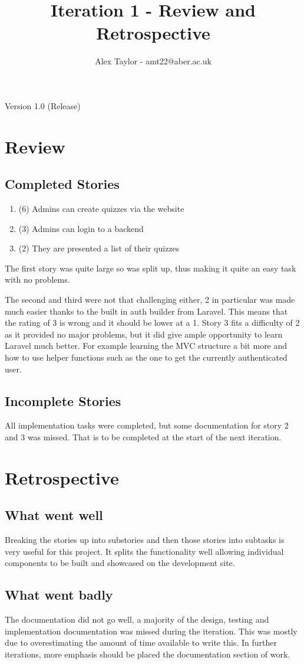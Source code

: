 \documentclass{article}
\title{Iteration 1 - Review and Retrospective}
\author{Alex Taylor - amt22@aber.ac.uk}
\begin{document}
\maketitle
\begin{center}
	Version 1.0 (Release)
\end{center}
\thispagestyle{empty}
\newpage

\section{Review}
\subsection{Completed Stories}
\begin{enumerate}
	\item (6) Admins can create quizzes via the website
	\item (3) Admins can login to a backend
	\item (2) They are presented a list of their quizzes
\end{enumerate}
The first story was quite large so was split up, thus making it quite an easy task with no problems.

The second and third were not that challenging either, 2 in particular was made much easier thanks to the built in auth builder from Laravel. This means that the rating of 3 is wrong and it should be lower at a 1. Story 3 fits a difficulty of 2 as it provided no major problems, but it did give ample opportunity to learn Laravel much better. For example learning the MVC structure a bit more and how to use helper functions such as the one to get the currently authenticated user.
\subsection{Incomplete Stories}
All implementation tasks were completed, but some documentation for story 2 and 3 was missed. That is to be completed at the start of the next iteration.
\newpage

\section{Retrospective}
\subsection{What went well}
Breaking the stories up into substories and then those stories into subtasks is very useful for this project. It splits the functionality well allowing individual components to be built and showcased on the development site.
\subsection{What went badly}
The documentation did not go well, a majority of the design, testing and implementation documentation was missed during the iteration. This was mostly due to overestimating the amount of time available to write this. In further iterations, more emphasis should be placed the documentation section of work.
\end{document}
